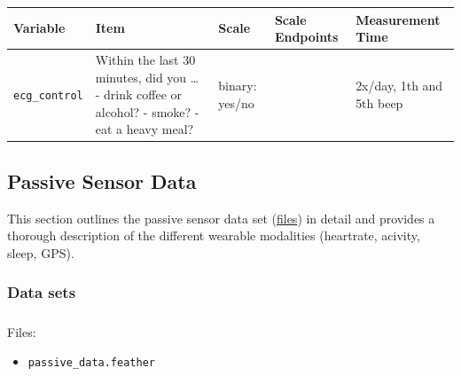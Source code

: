 \documentclass[
  letterpaper,
  DIV=11,
  numbers=noendperiod]{scrartcl}
\makeatletter
\let\oldsubparagraph\subparagraph
\renewcommand{\subparagraph}{
    \@ifstar
      \xxxSubParagraphStar
      \xxxSubParagraphNoStar
  }
\newcommand{\xxxSubParagraphStar}[1]{\oldsubparagraph*{#1}\mbox{}}
\newcommand{\xxxSubParagraphNoStar}[1]{\oldsubparagraph{#1}\mbox{}}
\providecommand{\tightlist}{%
  \setlength{\itemsep}{0pt}\setlength{\parskip}{0pt}}
\makeatother
\begin{document}
\begin{longtable}[]{@{}
  >{\raggedright\arraybackslash}p{}
  >{\raggedright\arraybackslash}p{}
  >{\raggedright\arraybackslash}p{}
  >{\raggedright\arraybackslash}p{}
  >{\raggedright\arraybackslash}p{}@{}}
\toprule\noalign{}
\begin{minipage}[b]{\linewidth}\raggedright
Variable
\end{minipage} & \begin{minipage}[b]{\linewidth}\raggedright
Item
\end{minipage} & \begin{minipage}[b]{\linewidth}\raggedright
Scale
\end{minipage} & \begin{minipage}[b]{\linewidth}\raggedright
Scale Endpoints
\end{minipage} & \begin{minipage}[b]{\linewidth}\raggedright
Measurement Time
\end{minipage} \\
\midrule\noalign{}
\endhead
\bottomrule\noalign{}
\endlastfoot
\texttt{ecg\_control} & Within the last 30 minutes, did you \ldots{} -
drink coffee or alcohol? - smoke? - eat a heavy meal? & binary: yes/no &
& 2x/day, 1th and 5th beep \\
\end{longtable}

\subsection{Passive Sensor Data}\label{passive-sensor-data}

This section outlines the passive sensor data set
(\hyperref[files]{files}) in detail and provides a thorough description
of the different wearable modalities (heartrate, acivity, sleep, GPS).

\subsubsection{Data sets}\label{data-sets-1}

\subparagraph{Files:}\label{files}

\begin{itemize}
\tightlist
\item
  \texttt{passive\_data.feather}
\end{itemize}
\end{document}
